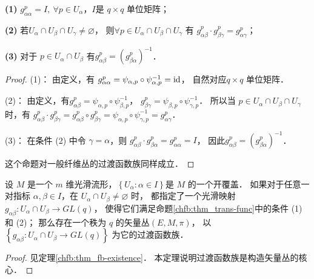 \begin{proposition}\label{chfb:thm_trans-func}
{\bfseries (1)} $g_{\alpha \alpha}^p=I,\ \forall p \in U_\alpha$，$I$是 $q \times q$ 单位矩阵；

{\bfseries (2)} 若$U_\alpha \cap U_\beta \cap U_\gamma \neq \varnothing$，
则$\forall p \in U_\alpha \cap U_\beta \cap U_\gamma$ 有
$g_{\alpha \beta}^p \cdot g_{\beta \gamma}^p=g_{\alpha \gamma}^p $；

{\bfseries (3)} 对于 $p \in U_\alpha \cap U_\beta$ 有$g_{\alpha \beta}^p=(g_{\beta \alpha}^p)^{-1} $．
\end{proposition}

\begin{proof}
    (1)： 由定义，有
    $ g_{\alpha \alpha}^p=\psi_{\alpha, p} \circ \psi_{\alpha, p}^{-1} = {\rm id}    $，
    自然对应$q \times q$ 单位矩阵．
    
(2)： 由定义，有$g_{\alpha \beta}^p=\psi_{\alpha, p} \circ \psi_{\beta, p}^{-1}$，
$g_{\beta \gamma}^p=\psi_{\beta, p} \circ \psi_{\gamma, p}^{-1}$．
所以当 $p \in U_\alpha \cap U_\beta \cap U_\gamma$ 时，有
$  g_{\alpha \beta}^p \cdot g_{\beta \gamma}^p 
    =  g_{\alpha \beta}^p \circ g_{\beta \gamma}^p 
    =  \psi_{\alpha, p} \circ \psi_{\gamma, p}^{-1}=g_{\alpha \gamma}^p$．


(3)： 在条件 (2) 中令 $\gamma=\alpha$，则
$g_{\alpha \beta}^p \cdot g_{\beta \alpha}^p=g_{\alpha\alpha}^p=I$，
因此$g_{\alpha \beta}^p=\left(g_{\beta \alpha}^p\right)^{-1} $．

这个命题对一般纤维丛的过渡函数族同样成立．
\end{proof}


\begin{theorem}\label{chfb:thm_vector-existence}
设 $M$ 是一个 $m$ 维光滑流形，$\left\{U_\alpha: \alpha \in I\right\}$是 $M$ 的一个开覆盖．
如果对于任意一对指标 $\alpha, \beta \in I$，在 $U_\alpha \cap U_\beta \neq \varnothing$ 时，
都指定了一个光滑映射 $g_{\alpha \beta}: U_\alpha \cap U_\beta \rightarrow GL(q)$，
使得它们满足命题\ref{chfb:thm_trans-func}中的条件 (1)和 (2)；
那么存在一个秩为 $q$ 的矢量丛$(E,M,\pi)$，
以 $\left\{g_{\alpha \beta}: U_\alpha \cap U_\beta \rightarrow GL(q)\right\}$ 为它的过渡函数族．
\end{theorem}

\begin{proof}
    见定理\ref{chfb:thm_fb-existence}．
    本定理说明过渡函数族是构造矢量丛的核心．
\end{proof}




